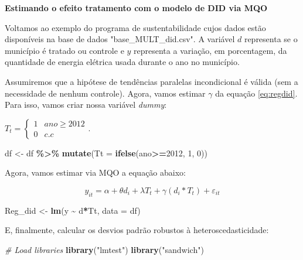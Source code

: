 \documentclass[portugues]{article}
\newenvironment{Shaded}{\begin{snugshade}}{\end{snugshade}}
\newcommand{\AttributeTok}[1]{\textcolor[rgb]{0.13,0.29,0.53}{#1}}
\newcommand{\CommentTok}[1]{\textcolor[rgb]{0.56,0.35,0.01}{\textit{#1}}}
\newcommand{\DecValTok}[1]{\textcolor[rgb]{0.00,0.00,0.81}{#1}}
\newcommand{\FunctionTok}[1]{\textcolor[rgb]{0.13,0.29,0.53}{\textbf{#1}}}
\newcommand{\NormalTok}[1]{#1}
\newcommand{\OtherTok}[1]{\textcolor[rgb]{0.56,0.35,0.01}{#1}}
\newcommand{\SpecialCharTok}[1]{\textcolor[rgb]{0.81,0.36,0.00}{\textbf{#1}}}
\newcommand{\StringTok}[1]{\textcolor[rgb]{0.31,0.60,0.02}{#1}}
\begin{document}
\begin{boxA}

\textbf{Estimando o efeito tratamento com o modelo de DID via MQO}
\vspace{5}

    Voltamos ao exemplo do programa de sustentabilidade cujos dados estão disponíveis na base de dados "base\_MULT\_did.csv". A variável $d$ representa se o município é tratado ou controle e $y$ representa a variação, em porcentagem, da quantidade de energia elétrica usada durante o ano no município.  
    
    Assumiremos que a hipótese de tendências paralelas incondicional é válida (sem a necessidade de nenhum controle). Agora, vamos estimar $\gamma$ da equação \eqref{eq:regdid}. Para isso, vamos criar nossa variável \textit{dummy}:
    
    $T_t = \begin{cases} 1 & ano \geq 2012 \\ 0 & c.c  \end{cases}$.

    \begin{Shaded}
\begin{Highlighting}[]
\NormalTok{df }\OtherTok{\textless{}{-}}\NormalTok{ df }\SpecialCharTok{\%\textgreater{}\%} \FunctionTok{mutate}\NormalTok{(}\AttributeTok{Tt =} \FunctionTok{ifelse}\NormalTok{(ano}\SpecialCharTok{\textgreater{}=}\DecValTok{2012}\NormalTok{, }\DecValTok{1}\NormalTok{, }\DecValTok{0}\NormalTok{))}
\end{Highlighting}
\end{Shaded}

Agora, vamos estimar via MQO a equação abaixo:

\begin{equation*}
    y_{it} = \alpha + \theta d_i + \lambda T_t + \gamma (d_i*T_t) +  \varepsilon_{it}
\end{equation*}

\begin{Shaded}
\begin{Highlighting}[]
\NormalTok{Reg\_did  }\OtherTok{\textless{}{-}} \FunctionTok{lm}\NormalTok{(y }\SpecialCharTok{\textasciitilde{}}\NormalTok{ d}\SpecialCharTok{*}\NormalTok{Tt, }\AttributeTok{data =}\NormalTok{ df)}
\end{Highlighting}
\end{Shaded}

E, finalmente, calcular os desvios padrão robustos à heteroscedasticidade:


    \begin{Shaded}
    \begin{Highlighting}[]
    \CommentTok{\# Load libraries}
    \FunctionTok{library}\NormalTok{(}\StringTok{"lmtest"}\NormalTok{)}
    \FunctionTok{library}\NormalTok{(}\StringTok{"sandwich"}\NormalTok{)}
    

\end{Highlighting}
\end{Shaded}
\end{boxA}
\end{document}
